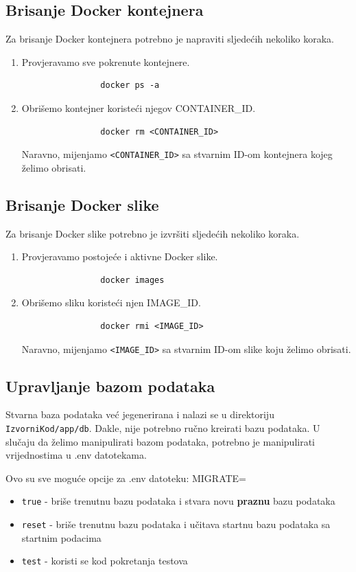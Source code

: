 		\subsection*{Brisanje Docker kontejnera}
		Za brisanje Docker kontejnera potrebno je napraviti sljedećih nekoliko koraka.
		\begin{enumerate}
			\item Provjeravamo sve pokrenute kontejnere.
			\begin{verbatim}
				docker ps -a
			\end{verbatim}
			\item Obrišemo kontejner koristeći njegov CONTAINER\_ID.
			\begin{verbatim}
				docker rm <CONTAINER_ID>
			\end{verbatim}
			Naravno, mijenjamo \texttt{<CONTAINER\_ID>} sa stvarnim ID-om kontejnera kojeg želimo obrisati.
		\end{enumerate}

		\subsection*{Brisanje Docker slike}
		Za brisanje Docker slike potrebno je izvršiti sljedećih nekoliko koraka.
		\begin{enumerate}
			\item Provjeravamo postojeće i aktivne Docker slike.
			\begin{verbatim}
				docker images
			\end{verbatim}
			\item Obrišemo sliku koristeći njen IMAGE\_ID.
			\begin{verbatim}
				docker rmi <IMAGE_ID>
			\end{verbatim}
			Naravno, mijenjamo \texttt{<IMAGE\_ID>} sa stvarnim ID-om slike koju želimo obrisati.
		\end{enumerate}

		\subsection*{Upravljanje bazom podataka}
			Stvarna baza podataka već  jegenerirana i nalazi se u direktoriju \texttt{IzvorniKod/app/db}.
			Dakle, nije potrebno ručno kreirati bazu podataka.
			U slučaju da želimo manipulirati bazom podataka, potrebno je manipulirati vrijednostima u .env datotekama.

			Ovo su sve moguće opcije za .env datoteku:
			MIGRATE=
			\begin{itemize}
				\item \texttt{true} - briše trenutnu bazu podataka i stvara novu \textbf{praznu} bazu podataka
				\item \texttt{reset} - briše trenutnu bazu podataka i učitava startnu bazu podataka sa startnim podacima
				\item \texttt{test} - koristi se kod pokretanja testova 
			\end{itemize}
	
